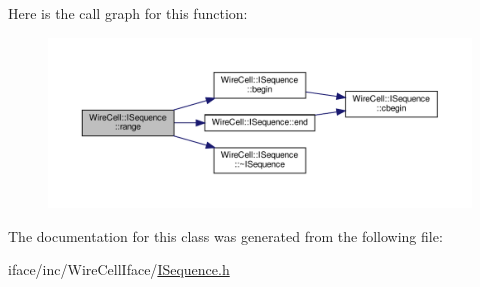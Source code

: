 Here is the call graph for this function\+:
\nopagebreak
\begin{figure}[H]
\begin{center}
\leavevmode
\includegraphics[width=350pt]{class_wire_cell_1_1_i_sequence_a5ea837972a6ba68ef563902edd25a8a4_cgraph}
\end{center}
\end{figure}


The documentation for this class was generated from the following file\+:\begin{DoxyCompactItemize}
\item 
iface/inc/\+Wire\+Cell\+Iface/\hyperlink{_i_sequence_8h}{I\+Sequence.\+h}\end{DoxyCompactItemize}
